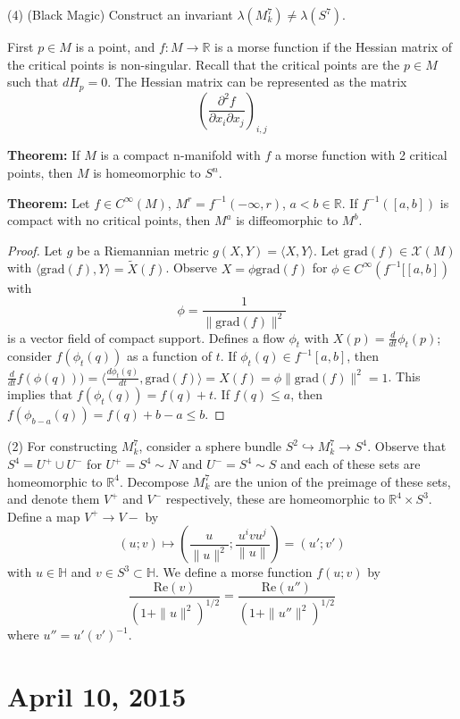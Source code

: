 \documentclass{article}
\begin{document}
(4) (Black Magic) Construct an invariant $\lambda(M^7_k) \neq \lambda(S^7)$.

First $p \in M$ is a point, and $f:M \to \mathbb{R}$ is a morse function if the Hessian matrix of the critical points is non-singular. Recall that the critical points are the $p \in M$ such that $dH_p = 0$. The Hessian matrix can be represented as the matrix
\[
\left( \frac{\partial^2 f}{\partial x_i \partial x_j} \right)_{i,j}
\]

\textbf{Theorem:} If $M$ is a compact n-manifold with $f$ a morse function with 2 critical points, then $M$ is homeomorphic to $S^n$.

\textbf{Theorem:} Let $f \in C^\infty(M)$, $M^r = f^{-1}(-\infty, r)$, $a< b \in \mathbb{R}$. If $f^{-1}([a,b])$ is compact with no critical points, then $M^a$ is diffeomorphic to $M^b$.
\begin{proof}
Let $g$ be a Riemannian metric $g(X,Y) = \langle X, Y \rangle$. Let $\text{grad}(f) \in \mathcal{X}(M)$ with $\langle \text{grad}(f), Y \rangle = \tilde{X}(f)$. Observe $X = \phi\text{grad}(f)$ for $\phi \in C^\infty(f^{-1}[[a,b])$ with \[
\phi = \frac{1}{ \| \text{grad}(f) \|^2}
\] is a vector field of compact support. Defines a flow $\phi_t$ with $X(p) = \frac{d}{dt} \phi_t(p)$; consider $f(\phi_t(q))$ as a function of $t$. If $\phi_t(q) \in f^{-1}[a,b]$, then $\frac{d}{dt}f(\phi(q))) = \langle  \frac{d \phi_t(q)}{dt}, \text{grad}(f) \rangle = X(f) = \phi \| \text{grad}(f) \|^2 = 1$. This implies that $f(\phi_t(q)) = f(q) + t$. If $f(q) \leq a$, then $f(\phi_{b-a}(q)) = f(q) + b - a \leq b$.
\end{proof}

(2) For constructing $M_k^7$, consider a sphere bundle $S^2 \hookrightarrow  M_k^7 \to S^4$. Observe that $S^4 = U^+ \cup U^-$ for $U^+ = S^4 \sim N$ and $U^- = S^4 \sim S$ and each of these sets are homeomorphic to $\mathbb{R}^4$. Decompose $M^7_k$ are the union of the preimage of these sets, and denote them $V^+$ and $V^-$ respectively, these are homeomorphic to $\mathbb{R}^4 \times S^3$. Define a map $V^+ \to V-$ by
\[
(u;v) \mapsto \left( \frac{u}{\| u \|^2}; \frac{u^ivu^j}{\| u \|} \right) = (u';v')
\]
with $u \in \mathbb{H}$ and $v \in S^3 \subset \mathbb{H}$. We define a morse function $f(u;v)$ by
\[
\frac{\text{Re}(v)}{(1 + \| u \|^2)^{1/2}} = \frac{\text{Re}(u'')}{(1+ \| u'' \|^2)^{1/2}}
\]
where $u'' = u'(v')^{-1}$.

\section{April 10, 2015}
\end{document}

